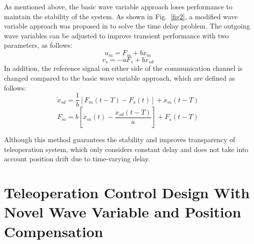 As mentioned above,
the basic wave variable approach loses performance to maintain  the stability of the system.
As shown in  Fig.~\ref{fig2},
a modified wave variable approach was proposed in \cite{b11} to solve the time delay problem.
The outgoing wave variables can be adjusted to improve transient performance with two parameters,
as follows:
\begin{equation}
    u_m = F_m + b \dot x_m\label{eq5}
\end{equation}
\begin{equation}
    v_s = -aF_s + b \dot x_{sd}\label{eq6}
\end{equation}
In addition, the reference signal on either 
side of the communication channel 
is changed compared to the basic wave variable approach,
which are defined as follows:
\begin{equation}
    \dot x_{sd}=\frac{1}{b}\left[F_m(t-T)-F_s(t)\right]+\dot x_m(t-T)\label{eqA}
\end{equation}
\begin{equation}
    F_{m}=b\left[\dot x_m(t)-\frac{\dot x_{sd}(t-T)}{a}\right]+F_s(t-T)\label{eqB}
\end{equation}
\par Although this method guarantees the stability
and improves transparency of teleoperation system,
which only considers constant delay 
and does not take into account position drift due to time-varying delay.

\section{Teleoperation Control Design With Novel Wave Variable and Position Compensation}


